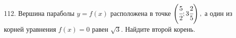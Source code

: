 112. Вершина параболы $y=f(x)$ расположена в точке $\left(\cfrac{5}{2};3\cfrac{2}{5}\right),$ а один из корней уравнения $f(x)=0$
равен $\sqrt{3}.$ Найдите второй корень.\\

